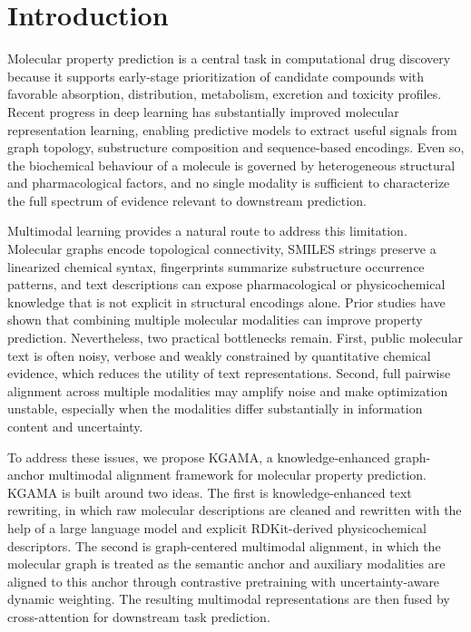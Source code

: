 \documentclass[webpdf,contemporary,large]{oup-authoring-template}%
\begin{document}

\maketitle

\section{Introduction}
Molecular property prediction is a central task in computational drug discovery because it supports early-stage prioritization of candidate compounds with favorable absorption, distribution, metabolism, excretion and toxicity profiles. Recent progress in deep learning has substantially improved molecular representation learning, enabling predictive models to extract useful signals from graph topology, substructure composition and sequence-based encodings. Even so, the biochemical behaviour of a molecule is governed by heterogeneous structural and pharmacological factors, and no single modality is sufficient to characterize the full spectrum of evidence relevant to downstream prediction.

Multimodal learning provides a natural route to address this limitation. Molecular graphs encode topological connectivity, SMILES strings preserve a linearized chemical syntax, fingerprints summarize substructure occurrence patterns, and text descriptions can expose pharmacological or physicochemical knowledge that is not explicit in structural encodings alone. Prior studies have shown that combining multiple molecular modalities can improve property prediction. Nevertheless, two practical bottlenecks remain. First, public molecular text is often noisy, verbose and weakly constrained by quantitative chemical evidence, which reduces the utility of text representations. Second, full pairwise alignment across multiple modalities may amplify noise and make optimization unstable, especially when the modalities differ substantially in information content and uncertainty.

To address these issues, we propose KGAMA, a knowledge-enhanced graph-anchor multimodal alignment framework for molecular property prediction. KGAMA is built around two ideas. The first is knowledge-enhanced text rewriting, in which raw molecular descriptions are cleaned and rewritten with the help of a large language model and explicit RDKit-derived physicochemical descriptors. The second is graph-centered multimodal alignment, in which the molecular graph is treated as the semantic anchor and auxiliary modalities are aligned to this anchor through contrastive pretraining with uncertainty-aware dynamic weighting. The resulting multimodal representations are then fused by cross-attention for downstream task prediction.
\end{document}
